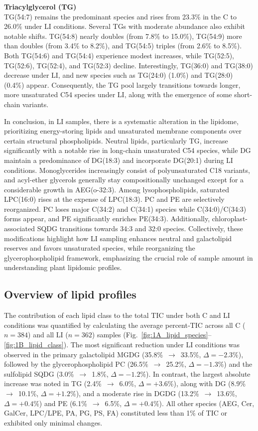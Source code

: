\documentclass[10pt,letterpaper]{article}
\begin{document}
\textbf{Triacylglycerol (TG)}  \\
TG(54:7) remains the predominant species and rises from 23.3\% in the C to 26.0\% under LI conditions. Several TGs with moderate abundance also exhibit notable shifts. TG(54:8) nearly doubles (from 7.8\% to 15.0\%), TG(54:9) more than doubles (from 3.4\% to 8.2\%), and TG(54:5) triples (from 2.6\% to 8.5\%). Both TG(54:6) and TG(54:4) experience modest increases, while TG(52:5), TG(52:6), TG(52:4), and TG(52:3) decline. Interestingly, TG(36:0) and TG(38:0) decrease under LI, and new species such as TG(24:0) (1.0\%) and TG(28:0) (0.4\%) appear. Consequently, the TG pool largely transitions towards longer, more unsaturated C54 species under LI, along with the emergence of some short-chain variants.

\bigskip

In conclusion, in LI samples, there is a systematic alteration in the lipidome, prioritizing energy-storing lipids and unsaturated membrane components over certain structural phospholipids. Neutral lipids, particularly TG, increase significantly with a notable rise in long-chain unsaturated C54 species, while DG maintain a predominance of DG(18:3) and incorporate DG(20:1) during LI conditions. Monoglycerides increasingly consist of polyunsaturated C18 variants, and acyl-ether glycerols generally stay compositionally unchanged except for a considerable growth in AEG(o-32:3). Among lysophospholipids, saturated LPC(16:0) rises at the expense of LPC(18:3). PC and PE are selectively reorganized. PC loses major C(34:2) and C(34:1) species while C(34:0)/C(34:3) forms appear, and PE significantly enriches PE(34:3). Additionally, chloroplast-associated SQDG transitions towards 34:3 and 32:0 species. Collectively, these modifications highlight how LI sampling enhances neutral and galactolipid reserves and favors unsaturated species, while reorganizing the glycerophospholipid framework, emphasizing the crucial role of sample amount in understanding plant lipidomic profiles.


\subsection*{Overview of lipid profiles}
The contribution of each lipid class to the total TIC under both C and LI conditions was quantified by calculating the average percent‐TIC across all C (\(n = 384\)) and all LI (\(n = 362\)) samples (Fig.~\ref{fig:1A_lipid_species}–\ref{fig:1B_lipid_class}). The most significant reduction under LI conditions was observed in the primary galactolipid MGDG (35.8\%~\(\rightarrow\)~33.5\%, \(\Delta = -2.3\%\)), followed by the glycerophospholipid PC (26.5\%~\(\rightarrow\)~25.2\%, \(\Delta = -1.3\%\)) and the sulfolipid SQDG (3.0\%~\(\rightarrow\)~1.8\%, \(\Delta = -1.2\%\)). In contrast, the largest absolute increase was noted in TG (2.4\%~\(\rightarrow\)~6.0\%, \(\Delta = +3.6\%\)), along with DG (8.9\%~\(\rightarrow\)~10.1\%, \(\Delta = +1.2\%\)), and a moderate rise in DGDG (13.2\%~\(\rightarrow\)~13.6\%, \(\Delta = +0.4\%\)) and PE (6.1\%~\(\rightarrow\)~6.5\%, \(\Delta = +0.4\%\)). All other species (AEG, Cer, GalCer, LPC/LPE, PA, PG, PS, FA) constituted less than 1\% of TIC or exhibited only minimal changes.
\end{document}
